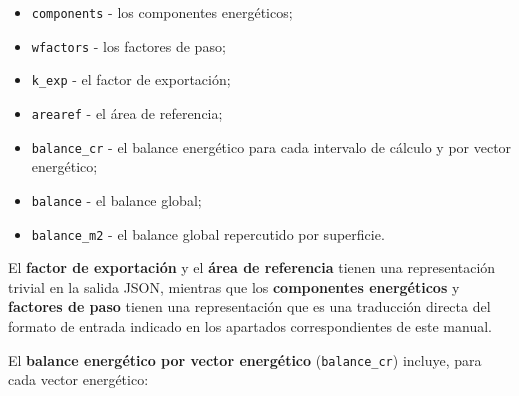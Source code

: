 \documentclass[10pt,notitlepage,oneside,a4paper]{article}
\begin{document}
\begin{itemize}
\item \texttt{components} - los componentes energéticos;
\item \texttt{wfactors} - los factores de paso;
\item \texttt{k\_exp} - el factor de exportación;
\item \texttt{arearef} - el área de referencia;
\item \texttt{balance\_cr} - el balance energético para cada intervalo de cálculo y por vector energético;
\item \texttt{balance} - el balance global;
\item \texttt{balance\_m2} - el balance global repercutido por superficie.
\end{itemize}

El \textbf{factor de exportación} y el \textbf{área de referencia} tienen una representación trivial en la salida JSON, mientras que los \textbf{componentes energéticos} y \textbf{factores de paso} tienen una representación que es una traducción directa del formato de entrada indicado en los apartados correspondientes de este manual.

El \textbf{balance energético por vector energético} (\texttt{balance\_cr}) incluye, para cada vector energético:
\end{document}
